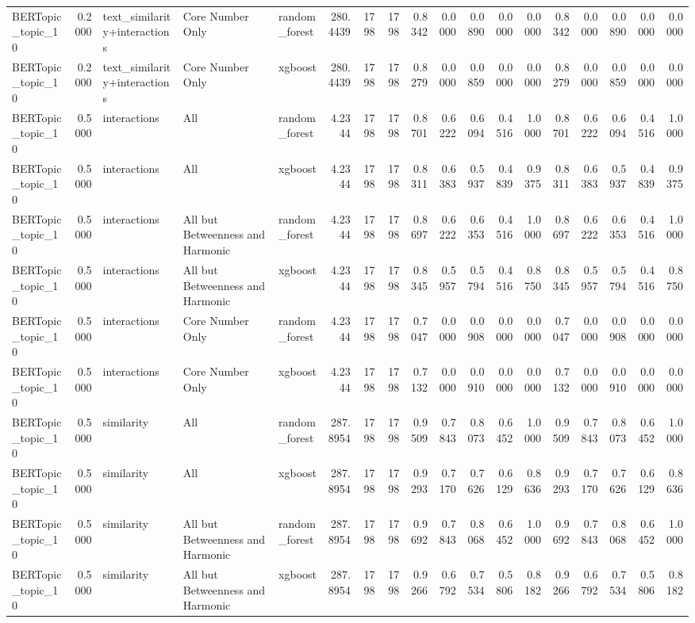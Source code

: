\begin{tabular}{lrlllrrrrrrrrrrrrr}
BERTopic_topic_10 & 0.2000 & text_similarity+interactions & Core Number Only & random_forest & 280.4439 & 1798 & 1798 & 0.8342 & 0.0000 & 0.0890 & 0.0000 & 0.0000 & 0.8342 & 0.0000 & 0.0890 & 0.0000 & 0.0000 \\
BERTopic_topic_10 & 0.2000 & text_similarity+interactions & Core Number Only & xgboost & 280.4439 & 1798 & 1798 & 0.8279 & 0.0000 & 0.0859 & 0.0000 & 0.0000 & 0.8279 & 0.0000 & 0.0859 & 0.0000 & 0.0000 \\
BERTopic_topic_10 & 0.5000 & interactions & All & random_forest & 4.2344 & 1798 & 1798 & 0.8701 & 0.6222 & 0.6094 & 0.4516 & 1.0000 & 0.8701 & 0.6222 & 0.6094 & 0.4516 & 1.0000 \\
BERTopic_topic_10 & 0.5000 & interactions & All & xgboost & 4.2344 & 1798 & 1798 & 0.8311 & 0.6383 & 0.5937 & 0.4839 & 0.9375 & 0.8311 & 0.6383 & 0.5937 & 0.4839 & 0.9375 \\
BERTopic_topic_10 & 0.5000 & interactions & All but Betweenness and Harmonic & random_forest & 4.2344 & 1798 & 1798 & 0.8697 & 0.6222 & 0.6353 & 0.4516 & 1.0000 & 0.8697 & 0.6222 & 0.6353 & 0.4516 & 1.0000 \\
BERTopic_topic_10 & 0.5000 & interactions & All but Betweenness and Harmonic & xgboost & 4.2344 & 1798 & 1798 & 0.8345 & 0.5957 & 0.5794 & 0.4516 & 0.8750 & 0.8345 & 0.5957 & 0.5794 & 0.4516 & 0.8750 \\
BERTopic_topic_10 & 0.5000 & interactions & Core Number Only & random_forest & 4.2344 & 1798 & 1798 & 0.7047 & 0.0000 & 0.0908 & 0.0000 & 0.0000 & 0.7047 & 0.0000 & 0.0908 & 0.0000 & 0.0000 \\
BERTopic_topic_10 & 0.5000 & interactions & Core Number Only & xgboost & 4.2344 & 1798 & 1798 & 0.7132 & 0.0000 & 0.0910 & 0.0000 & 0.0000 & 0.7132 & 0.0000 & 0.0910 & 0.0000 & 0.0000 \\
BERTopic_topic_10 & 0.5000 & similarity & All & random_forest & 287.8954 & 1798 & 1798 & 0.9509 & 0.7843 & 0.8073 & 0.6452 & 1.0000 & 0.9509 & 0.7843 & 0.8073 & 0.6452 & 1.0000 \\
BERTopic_topic_10 & 0.5000 & similarity & All & xgboost & 287.8954 & 1798 & 1798 & 0.9293 & 0.7170 & 0.7626 & 0.6129 & 0.8636 & 0.9293 & 0.7170 & 0.7626 & 0.6129 & 0.8636 \\
BERTopic_topic_10 & 0.5000 & similarity & All but Betweenness and Harmonic & random_forest & 287.8954 & 1798 & 1798 & 0.9692 & 0.7843 & 0.8068 & 0.6452 & 1.0000 & 0.9692 & 0.7843 & 0.8068 & 0.6452 & 1.0000 \\
BERTopic_topic_10 & 0.5000 & similarity & All but Betweenness and Harmonic & xgboost & 287.8954 & 1798 & 1798 & 0.9266 & 0.6792 & 0.7534 & 0.5806 & 0.8182 & 0.9266 & 0.6792 & 0.7534 & 0.5806 & 0.8182 \\

\end{tabular}
